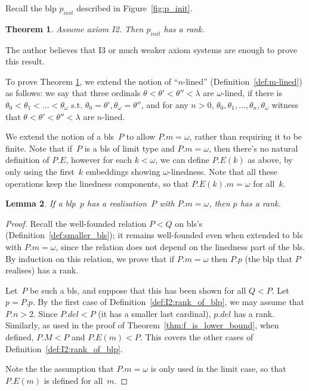 \documentclass{article}
\newtheorem{lemma}{Lemma}[section]
\newtheorem{theorem}[lemma]{Theorem}
\theoremstyle{definition}
\theoremstyle{remark}
\begin{document}
Recall the blp $p_{init}$ described in Figure~\ref{fig:p_init}.

\begin{theorem} \label{thm:I2:p_init_has_rank}
    Assume axiom I2. Then $p_{init}$ has a rank.
\end{theorem}

The author believes that I3 or much weaker axiom systems are enough to prove this result.

\medskip

To prove Theorem \ref{thm:I2:p_init_has_rank}, we extend the notion of ``$n$-lined'' (Definition~\ref{def:m-lined}) as follows: we say that three ordinals $\theta<\theta'<\theta''<\lambda$ are $\omega$-lined, if there is $\theta_0<\theta_1<...<\theta_{\omega}$ s.t. $\theta_0=\theta',\theta_\omega=\theta''$, and for any $n>0$, $\theta_0,\theta_1,...,\theta_{n},\theta_{\omega}$ witness that $\theta<\theta'<\theta''<\lambda$ are $n$-lined. 

We extend the notion of a bls~$P$ to allow $P.m=\omega$, rather than requiring it to be finite. 
Note that if~$P$ is a bls of limit type and $P.m=\omega$, then there's no natural definition of $P.E$, however for each $k<\omega$, we can define $P.E(k)$ as above, by only using the first~$k$ embeddings showing $\omega$-linedness. Note that all these operations keep the linedness components, so that $P.E(k).m=\omega$ for all~$k$. 


  \begin{lemma} \label{lem:I2:omega_lined_implies_rank}
      If a blp~$p$ has a realisation~$P$ with $P.m=\omega$, then $p$ has a rank.
  \end{lemma}

  \begin{proof}
    Recall the well-founded relation $P<Q$ on bls's (Definition~\ref{def:smaller_bls}); it remains well-founded even when extended to bls with $P.m=\omega$, since the relation does not depend on the linedness part of the bls. By induction on this relation, we prove that if $P.m=\omega$ then $P.p$ (the blp that $P$ realises) has a rank. 

    Let~$P$ be such a bls, and suppose that this has been shown for all $Q<P$. Let $p = P.p$. By the first case of Definition~\ref{def:I2:rank_of_blp}, we may assume that $P.n>2$. Since $P.del<P$ (it has a smaller last cardinal), $p.del$ has a rank. Similarly, as used in the proof of Theorem~\ref{thm:f_is_lower_bound}, when defined, $P.M<P$ and $P.E(m)<P$. This covers the other cases of Definition~\ref{def:I2:rank_of_blp}. 

    Note the the assumption that $P.m = \omega$ is only used in the limit case, so that $P.E(m)$ is defined for all~$m$. 
\end{proof}
\end{document}

